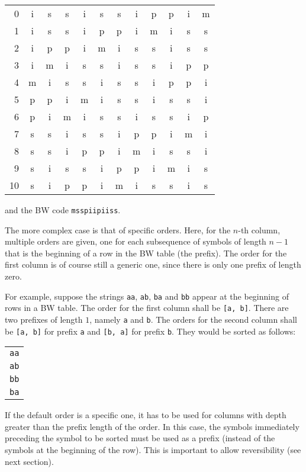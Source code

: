 \documentclass[a4paper]{scrreprt}
\begin{document}
\begin{tabular}{|r||ccccccccccc|}
\hline
0 & i & s & s & i & s & s & i & p & p & i & m \\
1 & i & s & s & i & p & p & i & m & i & s & s \\
2 & i & p & p & i & m & i & s & s & i & s & s \\
3 & i & m & i & s & s & i & s & s & i & p & p \\
4 & m & i & s & s & i & s & s & i & p & p & i \\
5 & p & p & i & m & i & s & s & i & s & s & i \\
6 & p & i & m & i & s & s & i & s & s & i & p \\
7 & s & s & i & s & s & i & p & p & i & m & i \\
8 & s & s & i & p & p & i & m & i & s & s & i \\
9 & s & i & s & s & i & p & p & i & m & i & s \\
10 & s & i & p & p & i & m & i & s & s & i & s \\
\hline
\end{tabular}

and the BW code \texttt{msspiipiiss}.

The more complex case is that of specific orders. Here, for the \(n\)-th column,
multiple orders are given, one for each subsequence of symbols of length \(n -
1\) that is the beginning of a row in the BW table (the prefix). The order
for the first column is of course still a generic one, since there is only one
prefix of length zero.

For example, suppose the strings \texttt{aa}, \texttt{ab}, \texttt{ba} and
\texttt{bb} appear at the beginning of rows in a BW table. The order for the
first column shall be \texttt{[a, b]}. There are two prefixes of length \(1\),
namely \texttt{a} and \texttt{b}. The orders for the second column shall be
\texttt{[a, b]} for prefix \texttt{a} and \texttt{[b, a]} for prefix \texttt{b}.
They would be sorted as follows:

\begin{tabular}{c}
\texttt{aa} \\
\texttt{ab} \\
\texttt{bb} \\ 
\texttt{ba} \\
\end{tabular}

If the default order is a specific one, it has to be used for columns with depth
greater than the prefix length of the order. In this case, the symbols
immediately preceding the symbol to be sorted must be used as a prefix (instead
of the symbols at the beginning of the row). This is important to allow
reversibility (see next section).
\end{document}
